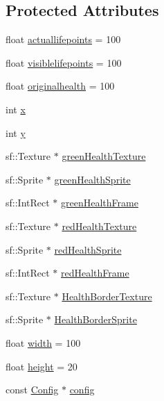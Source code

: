 \subsection*{Protected Attributes}
\begin{DoxyCompactItemize}
\item 
float \hyperlink{classHealth_a9377f6baf4370a4682201d57151aefdd}{actuallifepoints} = 100
\item 
float \hyperlink{classHealth_af0aaa45a0e5e94a3c22ee96d08514513}{visiblelifepoints} = 100
\item 
float \hyperlink{classHealth_aee066fa0c8d1ad09e1266882c258d006}{originalhealth} = 100
\item 
int \hyperlink{classHealth_aceaf91c7887b0e3f9d94d91909c3b231}{x}
\item 
int \hyperlink{classHealth_addeb1f5a9d1929e16770074e17f8f1f2}{y}
\item 
sf\+::\+Texture $\ast$ \hyperlink{classHealth_a7b172b4792e34b968b5605f952bb1061}{green\+Health\+Texture}
\item 
sf\+::\+Sprite $\ast$ \hyperlink{classHealth_a729ed01960f48808519a488c79781c38}{green\+Health\+Sprite}
\item 
sf\+::\+Int\+Rect $\ast$ \hyperlink{classHealth_af1fdeaed9cb59cd776f18487b71a67dd}{green\+Health\+Frame}
\item 
sf\+::\+Texture $\ast$ \hyperlink{classHealth_ab08ff98832c9ac6297a803fdbc6a69cd}{red\+Health\+Texture}
\item 
sf\+::\+Sprite $\ast$ \hyperlink{classHealth_a81427f31d58c914e2d2ad0a28261288d}{red\+Health\+Sprite}
\item 
sf\+::\+Int\+Rect $\ast$ \hyperlink{classHealth_a437bfdf8c9420a54cc79e034bc7d0f28}{red\+Health\+Frame}
\item 
sf\+::\+Texture $\ast$ \hyperlink{classHealth_ae2f056488bd29532dd1d7af0e4ec4a2b}{Health\+Border\+Texture}
\item 
sf\+::\+Sprite $\ast$ \hyperlink{classHealth_a3c4b6f76f94061c6ac6ef790ea8f9a72}{Health\+Border\+Sprite}
\item 
float \hyperlink{classHealth_a423cedff47687a9b3cdbaa4b0b2979ac}{width} = 100
\item 
float \hyperlink{classHealth_a28762e189b693258d4435e3082bad0b1}{height} = 20
\item 
const \hyperlink{classConfig}{Config} $\ast$ \hyperlink{classHealth_afebf7cd861e2a152d5da8aa0275a8222}{config}
\end{DoxyCompactItemize}


